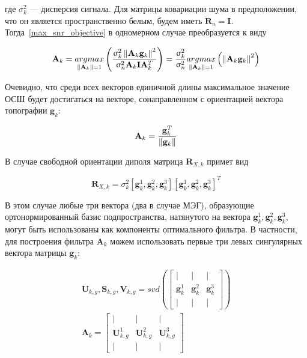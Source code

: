 где $\sigma^2_k$ --- дисперсия сигнала.
Для матрицы ковариации шума в предположении, что он является пространственно белым, 
будем иметь $\mathbf{R}_n = \mathbf{I}$.
Тогда~\ref{max_snr_objective} в одномерном случае преобразуется к виду

\begin{equation}
    \mathbf{A}_k =
        \underset{\left\lVert\mathbf{A}_k\right\rVert = 1}{argmax}\left(
            \frac{\upsigma_k^2\left\lVert\mathbf{A}_k \mathbf{g}_k\right\rVert^2}
                 {\upsigma_n^2\mathbf{A}_k \mathbf{I} \mathbf{A}_k^T}
             \right) = \frac{\upsigma_k^2}{\upsigma_n^2}\underset{\left\lVert\mathbf{A}_k\right\rVert = 1}{argmax}\left(
                \left\lVert\mathbf{A}_k \mathbf{g}_k\right\rVert^2
             \right)
\end{equation}


Очевидно, что среди всех векторов единичной длины максимальное значение ОСШ
будет достигаться на векторе, сонаправленном с ориентацией вектора топографии $\mathbf{g}_k$:

\begin{equation}
    \mathbf{A}_k = \frac{\mathbf{g}_k^T}{\left\lVert\mathbf{g}_k\right\rVert}
\end{equation}

В случае свободной ориентации диполя матрица $\mathbf{R}_{X,k}$ примет вид

\begin{equation}
    \mathbf{R}_{X,k} = \sigma_k^2 \left[
            \mathbf{g}_k^1, \mathbf{g}_k^2, \mathbf{g}_k^3 \right]
        {\left[\mathbf{g}_k^1, \mathbf{g}_k^2, \mathbf{g}_k^3\right]}^T
\end{equation}

В этом случае любые три вектора (два в случае МЭГ),
образующие ортонормированный базис подпространства, натянутого на
вектора $\mathbf{g}_k^1, \mathbf{g}_k^2, \mathbf{g}_k^3$,
могут быть использованы как компоненты оптимального фильтра.
В частности, для построения фильтра $\mathbf{A}_k$ можем использовать
первые три левых сингулярных вектора матрицы $\mathbf{g}_k$:

\begin{gather}
    \mathbf{U}_{k,g}, \mathbf{S}_{k,g}, \mathbf{V}_{k,g} = svd\left(
            \begin{bmatrix}
                |                 & |              & |              \\
                \mathbf{g}_k^1    & \mathbf{g}_k^2 & \mathbf{g}_k^3 \\
                |                 & |              & |
            \end{bmatrix}
     \right)\\
    \mathbf{A}_k = 
            \begin{bmatrix}
                |                 & |              & |              \\
                \mathbf{U}_{k, g}^1    & \mathbf{U}_{k,g}^2 & \mathbf{U}_{k,g}^3 \\
                |                 & |              & |
            \end{bmatrix}
\end{gather}

